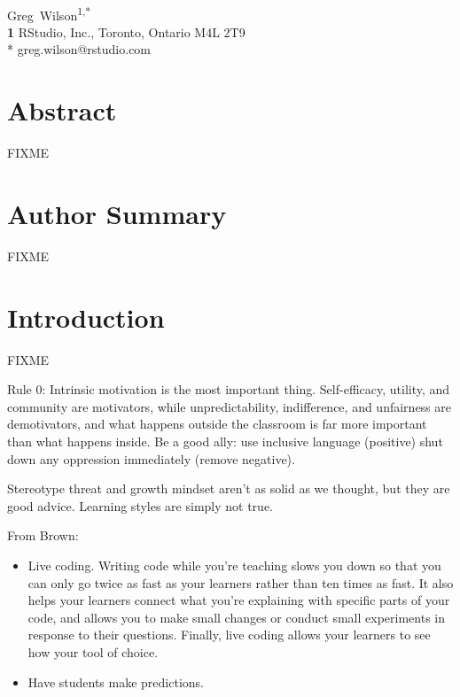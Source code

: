 \documentclass[10pt,letterpaper]{article}
\begin{document}
\vspace*{0.2in}

\begin{flushleft}
{\Large
\textbf{}
}
\newline
\\
{Greg~Wilson}\textsuperscript{1,*}
\\
\textbf{1} RStudio, Inc., Toronto, Ontario M4L 2T9
\\
\bigskip
* greg.wilson@rstudio.com
\end{flushleft}

\section*{Abstract}

FIXME

\section*{Author Summary}

FIXME

\section*{Introduction}

FIXME

Rule 0: Intrinsic motivation is the most important thing.
Self-efficacy, utility, and community are motivators,
while unpredictability, indifference, and unfairness are demotivators,
and what happens outside the classroom is far more important than what happens inside.
Be a good ally:
use inclusive language (positive)
shut down any oppression immediately (remove negative).

Stereotype threat and growth mindset aren't as solid as we thought,
but they are good advice.
Learning styles are simply not true.

From Brown:

\begin{itemize}

\item Live coding.
  Writing code while you're teaching slows you down so that you can only go twice as fast as your learners
  rather than ten times as fast.
  It also helps your learners connect what you're explaining with specific parts of your code,
  and allows you to make small changes or conduct small experiments in response to their questions.
  Finally,
  live coding allows your learners to see how your tool of choice.

\item Have students make predictions.

\end{itemize}
\end{document}
